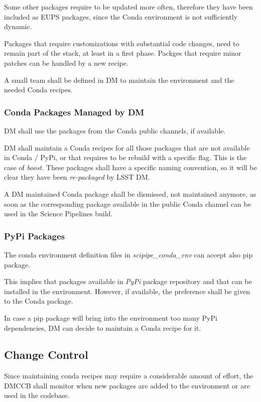 Some other packages require to be updated more often, therefore they have been included as EUPS packages, since the Conda environment is not sufficiently dynamic.

Packages that require customizations with substantial code changes, need to remain part of the stack, at least in a first phase. 
Packges that require minor patches can be handled by a new recipe.

A small team shall be defined in DM to maintain the environment and the needed Conda recipes.


\subsubsection{Conda Packages Managed by DM} \label{sec:3rddmpkgs}

DM shall use the packages from the Conda public channels, if available.

DM shall maintain a Conda recipes for all those packages that are not available in Conda / PyPi, or that requires to be rebuild with a specific flag. This is the case of \textit{boost}.
These packages shall have a specific naming convention, so it will be clear they have been \textit{re-packaged} by LSST DM.

A DM maintained Conda package shall be dismissed, not maintained anymore, as soon as the corresponding package available in the public Conda channel can be used in the Science Pipelines build.


\subsubsection{PyPi Packages} \label{sec:pypi}

The conda environment definition files in \textit{scipipe\_conda\_env} can accept also pip package. 

This implies that packages available in \textit{PyPi} package repository and that can be installed in the environment. 
However, if available, the preference shall be given to the Conda package.

In case a pip package will bring into the environment too many PyPi dependencies, DM can decide to maintain a Conda recipe for it.


\subsection{Change Control}

Since maintaining conda recipes may require a considerable amount of effort, the DMCCB shall monitor when new packages are added to the environment or are used in the codebase.

